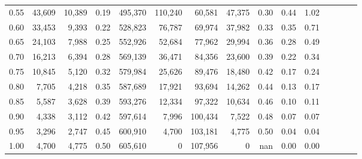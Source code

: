 \begin{tabular}{rrrcrrrrrrrrrrr}
0.55 &  43,609 &  10,389 &                                       0.19 &  495,370 &  110,240 &   60,581 &   47,375 &  0.30 &  0.44 &                         1.02 \\
0.60 &  33,453 &   9,393 &                                       0.22 &  528,823 &   76,787 &   69,974 &   37,982 &  0.33 &  0.35 &                         0.71 \\
0.65 &  24,103 &   7,988 &                                       0.25 &  552,926 &   52,684 &   77,962 &   29,994 &  0.36 &  0.28 &                         0.49 \\
0.70 &  16,213 &   6,394 &                                       0.28 &  569,139 &   36,471 &   84,356 &   23,600 &  0.39 &  0.22 &                         0.34 \\
0.75 &  10,845 &   5,120 &                                       0.32 &  579,984 &   25,626 &   89,476 &   18,480 &  0.42 &  0.17 &                         0.24 \\
0.80 &   7,705 &   4,218 &                                       0.35 &  587,689 &   17,921 &   93,694 &   14,262 &  0.44 &  0.13 &                         0.17 \\
0.85 &   5,587 &   3,628 &                                       0.39 &  593,276 &   12,334 &   97,322 &   10,634 &  0.46 &  0.10 &                         0.11 \\
0.90 &   4,338 &   3,112 &                                       0.42 &  597,614 &    7,996 &  100,434 &    7,522 &  0.48 &  0.07 &                         0.07 \\
0.95 &   3,296 &   2,747 &                                       0.45 &  600,910 &    4,700 &  103,181 &    4,775 &  0.50 &  0.04 &                         0.04 \\
1.00 &   4,700 &   4,775 &                                       0.50 &  605,610 &        0 &  107,956 &        0 &   nan &  0.00 &                         0.00 \\
\bottomrule
\end{tabular}
